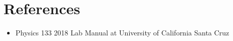 \documentclass[a4paper]{article}
\begin{document}
\clearpage

\section{References}
\begin{itemize}
\item Physics 133 2018 Lab Manual at University of California Santa Cruz
\end{itemize}
\end{document}
